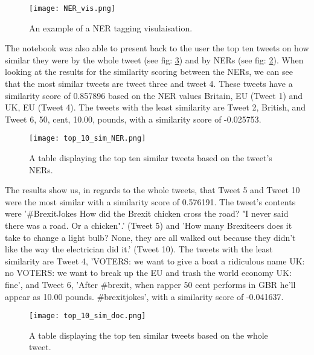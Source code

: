 	\begin{figure}[h]
		\centering
		\texttt{[image: NER\_vis.png]}
		\caption{An example of a NER tagging visulaisation.}
		\label{fig:NER_example}
		
	\end{figure}

	The notebook was also able to present back to the user the top ten tweets on how similar they were by the whole tweet (see fig: \ref{fig:top_10_sim_doc}) and by NERs (see fig: \ref{fig:top_10_sim_NER}). When looking at the results for the similarity scoring between the NERs, we can see that the most similar tweets are tweet three and tweet 4. These tweets have a similarity score of 0.857896 based on the NER values Britain, EU (Tweet 1) and UK, EU (Tweet 4). The tweets with the least similarity are Tweet 2, British, and Tweet 6, 50, cent, 10.00, pounds, with a similarity score of -0.025753.
	 
	
	\begin{figure}[h]
		\centering
		\texttt{[image: top\_10\_sim\_NER.png]}
		\caption{A table displaying the top ten similar tweets based on the tweet's NERs.}
		\label{fig:top_10_sim_NER}
		
	\end{figure}

	The results show us, in regards to the whole tweets, that Tweet 5 and Tweet 10 were the most similar with a similarity score of 0.576191. The tweet's contents were '\#BrexitJokes How did the Brexit chicken cross the road? "I never said there was a road. Or a chicken".' (Tweet 5) and 'How many Brexiteers does it take to change a light bulb? None, they are all walked out because they didn't like the way the electrician did it.' (Tweet 10). The tweets with the least similarity are Tweet 4, 'VOTERS: we want to give a boat a ridiculous name UK: no VOTERS: we want to break up the EU and trash the world economy UK: fine', and Tweet 6, 'After \#brexit, when rapper 50 cent performs in GBR he'll appear as 10.00 pounds. \#brexitjokes', with a similarity score of -0.041637.

	\begin{figure}[h]
		\centering
		\texttt{[image: top\_10\_sim\_doc.png]}
		\caption{A table displaying the top ten similar tweets based on the whole tweet.}
		\label{fig:top_10_sim_doc}
		
	\end{figure}

